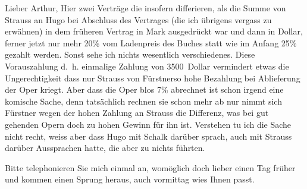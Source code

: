 \pstart{}Lieber Arthur,\pend\vspace{0.5em}
\pstart
           Hier zwei Verträge die insofern differieren, als die Summe von Strauss an Hugo bei
               Abschluss des Vertrages (die ich übrigens vergass zu erwähnen) in dem früheren
               Vertrag in Mark ausgedrückt war und dann in Dollar, ferner jetzt nur mehr 20{\%} vom Ladenpreis des Buches statt wie im Anfang 25{\%} gezahlt werden. Sonst sehe ich nichts wesentlich
               verschiedenes. Diese Vorauszahlung d. h. einmalige Zahlung von 3500 Dollar vermindert
               etwas die Ungerechtigkeit dass nur Strauss von
                  Fürstnerso hohe Bezahlung bei Ablieferung der Oper kriegt.
               Aber dass die Oper blos 7{\%} abrechnet ist schon irgend eine
               komische Sache, denn tatsächlich rechnen sie schon mehr ab nur nimmt sich Fürstner wegen der hohen Zahlung an Strauss die Differenz, was bei gut gehenden
               Opern doch zu hohen Gewinn für ihn ist. Verstehen tu ich die Sache nicht recht, weiss
               aber dass Hugo mit Schalk darüber sprach, auch mit Strauss darüber Aussprachen hatte, die aber zu nichts
               führten.\pend
           
\pstart
           Bitte telephonieren Sie mich einmal an, womöglich doch lieber einen Tag früher und
               kommen einen Sprung heraus, auch vormittag wies Ihnen passt.\pend
           
